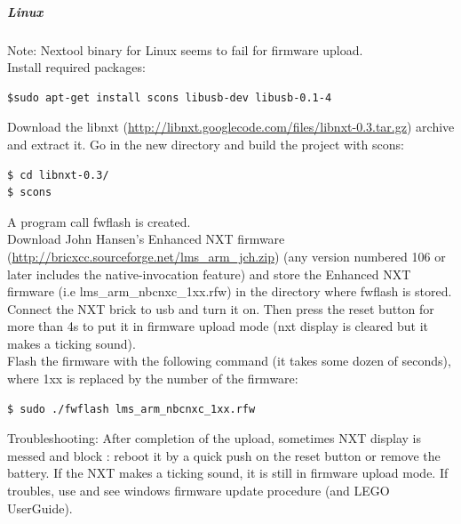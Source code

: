 \subparagraph{Linux}
Note: Nextool binary for Linux seems to fail for firmware upload.\\
Install required packages:
\begin{verbatim}
$sudo apt-get install scons libusb-dev libusb-0.1-4
\end{verbatim}
Download the libnxt (\href{http://libnxt.googlecode.com/files/libnxt-0.3.tar.gz}{http://libnxt.googlecode.com/files/libnxt-0.3.tar.gz}) archive and extract it. Go in the new directory and build the project with scons:
\begin{verbatim}
$ cd libnxt-0.3/ 
$ scons
\end{verbatim}

A program call fwflash is created.\\
Download John Hansen's Enhanced NXT firmware (\href{http://bricxcc.sourceforge.net/lms_arm_jch.zip}{http://bricxcc.sourceforge.net/lms\_arm\_jch.zip}) (any version numbered 106 or later includes the native-invocation feature) and store the Enhanced NXT firmware (i.e lms\_arm\_nbcnxc\_1xx.rfw) in the directory where fwflash is stored.\\
Connect the NXT brick to usb and turn it on. Then press the reset button for more than 4s to put it in firmware upload mode (nxt display is cleared but it makes a ticking sound).\\
Flash the firmware with the following command (it takes some dozen of seconds), where 1xx is replaced by the number of the firmware:
\begin{verbatim}
$ sudo ./fwflash lms_arm_nbcnxc_1xx.rfw
\end{verbatim}

Troubleshooting: After completion of the upload, sometimes NXT display is messed and block : reboot it by a quick push on the reset button or remove the battery. If the NXT makes a ticking sound, it is still in firmware upload mode. If troubles, use and see windows firmware update procedure (and LEGO UserGuide).\\


